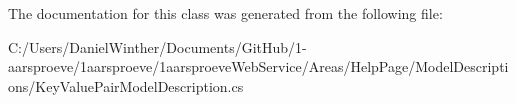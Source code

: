 The documentation for this class was generated from the following file\+:\begin{DoxyCompactItemize}
\item 
C\+:/\+Users/\+Daniel\+Winther/\+Documents/\+Git\+Hub/1-\/aarsproeve/1aarsproeve/1aarsproeve\+Web\+Service/\+Areas/\+Help\+Page/\+Model\+Descriptions/Key\+Value\+Pair\+Model\+Description.\+cs\end{DoxyCompactItemize}
